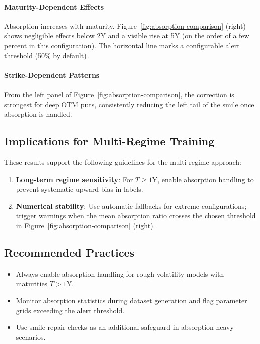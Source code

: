 	\paragraph{Maturity-Dependent Effects}
	Absorption increases with maturity. Figure~\ref{fig:absorption-comparison} (right) shows negligible
	effects below 2Y and a visible rise at 5Y (on the order of a few percent in this configuration).
	The horizontal line marks a configurable alert threshold (50\% by default).
	
	\paragraph{Strike-Dependent Patterns}
	From the left panel of Figure~\ref{fig:absorption-comparison}, the correction is strongest for deep OTM puts, consistently reducing the left tail of the smile once absorption is handled.
	
	\subsection{Implications for Multi-Regime Training}
	
	These results support the following guidelines for the multi-regime approach:
	\begin{enumerate}[leftmargin=*]
		\item \textbf{Long-term regime sensitivity}: For $T \ge 1$Y, enable absorption handling to prevent systematic upward bias in labels.
		\item \textbf{Numerical stability}: Use automatic fallbacks for extreme configurations; trigger warnings when the mean absorption ratio crosses the chosen threshold in Figure~\ref{fig:absorption-comparison} (right).
	\end{enumerate}
	
	\subsection{Recommended Practices}
	
	\begin{itemize}[nosep]
		\item Always enable absorption handling for rough volatility models with maturities $T>1$Y.
		\item Monitor absorption statistics during dataset generation and flag parameter grids exceeding the alert threshold.
		\item Use smile-repair checks as an additional safeguard in absorption-heavy scenarios.
	\end{itemize}
	
